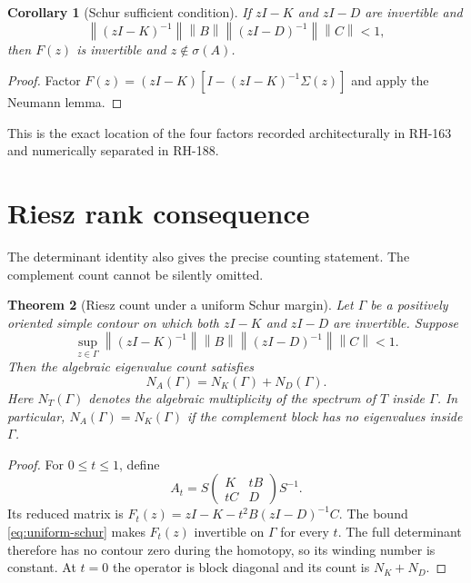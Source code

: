 \documentclass[12pt]{article}
\newtheorem{theorem}{Theorem}[section]
\newtheorem{corollary}[theorem]{Corollary}
\theoremstyle{remark}
\newcommand{\norm}[1]{\left\lVert#1\right\rVert}
\begin{document}
\begin{corollary}[Schur sufficient condition]\label{cor:schur}
If $zI-K$ and $zI-D$ are invertible and
\begin{equation}\label{eq:schur-condition}
 \norm{(zI-K)^{-1}}
 \norm B
 \norm{(zI-D)^{-1}}
 \norm C<1,
\end{equation}
then $F(z)$ is invertible and $z\notin\sigma(A)$.
\end{corollary}

\begin{proof}
Factor
$F(z)=(zI-K)[I-(zI-K)^{-1}\Sigma(z)]$ and apply the Neumann lemma.
\end{proof}

This is the exact location of the four factors recorded architecturally in
RH-163 and numerically separated in RH-188.

\section{Riesz rank consequence}

The determinant identity also gives the precise counting statement.  The
complement count cannot be silently omitted.

\begin{theorem}[Riesz count under a uniform Schur margin]\label{thm:riesz-count}
Let $\Gamma$ be a positively oriented simple contour on which both
$zI-K$ and $zI-D$ are invertible.  Suppose
\begin{equation}\label{eq:uniform-schur}
 \sup_{z\in\Gamma}
 \norm{(zI-K)^{-1}}\norm B
 \norm{(zI-D)^{-1}}\norm C<1.
\end{equation}
Then the algebraic eigenvalue count satisfies
\begin{equation}\label{eq:count-sum}
 N_A(\Gamma)=N_K(\Gamma)+N_D(\Gamma).
\end{equation}
Here $N_T(\Gamma)$ denotes the algebraic multiplicity of the spectrum of
$T$ inside $\Gamma$.
In particular, $N_A(\Gamma)=N_K(\Gamma)$ if the complement block has no
eigenvalues inside $\Gamma$.
\end{theorem}

\begin{proof}
For $0\le t\le1$, define
\[
 A_t=S\begin{pmatrix}K&tB\\tC&D\end{pmatrix}S^{-1}.
\]
Its reduced matrix is
$F_t(z)=zI-K-t^2B(zI-D)^{-1}C$.  The bound
\eqref{eq:uniform-schur} makes $F_t(z)$ invertible on $\Gamma$ for every
$t$.  The full determinant therefore has no contour zero during the
homotopy, so its winding number is constant.  At $t=0$ the operator is block
diagonal and its count is $N_K+N_D$.
\end{proof}
\end{document}
